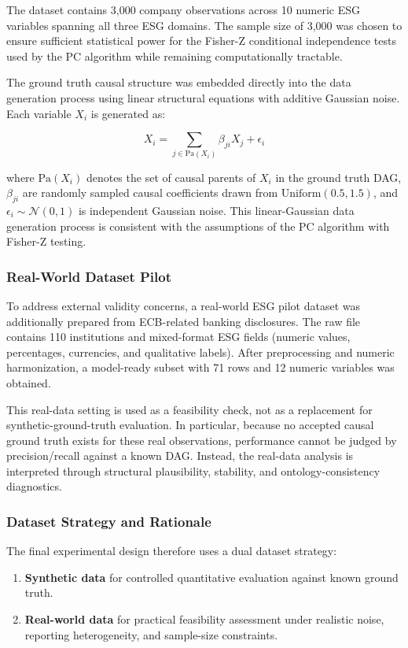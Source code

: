 \documentclass[a4paper,11pt,oneside]{article}
\begin{document}
The dataset contains 3,000 company observations across 10 numeric ESG variables spanning all three ESG domains. The sample size of 3,000 was chosen to ensure sufficient statistical power for the Fisher-Z conditional independence tests used by the PC algorithm while remaining computationally tractable.

The ground truth causal structure was embedded directly into the data generation process using linear structural equations with additive Gaussian noise. Each variable $X_i$ is generated as:

\begin{equation}
    X_i = \sum_{j \in \text{Pa}(X_i)} \beta_{ji} X_j + \epsilon_i
\end{equation}

where $\text{Pa}(X_i)$ denotes the set of causal parents of $X_i$ in the ground truth DAG, $\beta_{ji}$ are randomly sampled causal coefficients drawn from $\text{Uniform}(0.5, 1.5)$, and $\epsilon_i \sim \mathcal{N}(0, 1)$ is independent Gaussian noise. This linear-Gaussian data generation process is consistent with the assumptions of the PC algorithm with Fisher-Z testing.

\subsubsection{Real-World Dataset Pilot}

To address external validity concerns, a real-world ESG pilot dataset was additionally prepared from ECB-related banking disclosures. The raw file contains 110 institutions and mixed-format ESG fields (numeric values, percentages, currencies, and qualitative labels). After preprocessing and numeric harmonization, a model-ready subset with 71 rows and 12 numeric variables was obtained.

This real-data setting is used as a feasibility check, not as a replacement for synthetic-ground-truth evaluation. In particular, because no accepted causal ground truth exists for these real observations, performance cannot be judged by precision/recall against a known DAG. Instead, the real-data analysis is interpreted through structural plausibility, stability, and ontology-consistency diagnostics.

\subsubsection{Dataset Strategy and Rationale}

The final experimental design therefore uses a dual dataset strategy:
\begin{enumerate}
    \item \textbf{Synthetic data} for controlled quantitative evaluation against known ground truth.
    \item \textbf{Real-world data} for practical feasibility assessment under realistic noise, reporting heterogeneity, and sample-size constraints.
\end{enumerate}
\end{document}
